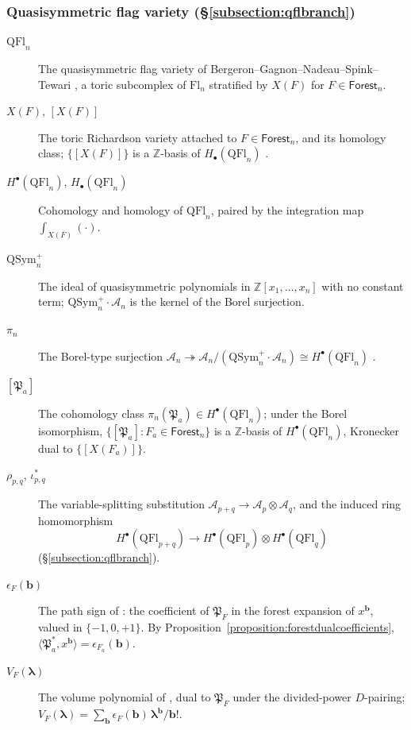 \documentclass{amsart}
\theoremstyle{definition}
\theoremstyle{remark}
\numberwithin{equation}{subsection}
\newcommand{\coma}{\mathcal{A}}
\newcommand{\forest}{\mathfrak{P}}
\begin{document}
\subsubsection*{Quasisymmetric flag variety (\S\ref{subsection:qflbranch})}
\begin{description}
\item[$\mathrm{QFl}_n$] The quasisymmetric flag variety of Bergeron--Gagnon--Nadeau--Spink--Tewari \cite{bergeron2025qsymflag}, a toric subcomplex of $\mathrm{Fl}_n$ stratified by $X(F)$ for $F\in\mathsf{Forest}_n$.
\item[{$X(F)$, $[X(F)]$}] The toric Richardson variety attached to $F\in\mathsf{Forest}_n$, and its homology class; $\{[X(F)]\}$ is a $\mathbb{Z}$-basis of $H_\bullet(\mathrm{QFl}_n)$ \cite[Cor.~11.6]{bergeron2025qsymflag}.
\item[$H^\bullet(\mathrm{QFl}_n)$, $H_\bullet(\mathrm{QFl}_n)$] Cohomology and homology of $\mathrm{QFl}_n$, paired by the integration map $\int_{X(F)}(\cdot)$.
\item[$\mathrm{QSym}_n^+$] The ideal of quasisymmetric polynomials in $\mathbb{Z}[x_1,\ldots,x_n]$ with no constant term; $\mathrm{QSym}_n^+\!\cdot\coma_n$ is the kernel of the Borel surjection.
\item[$\pi_n$] The Borel-type surjection $\coma_n\twoheadrightarrow\coma_n/(\mathrm{QSym}_n^+\!\cdot\coma_n)\cong H^\bullet(\mathrm{QFl}_n)$ \cite[Thm.~A and Cor.~12.5]{bergeron2025qsymflag}.
\item[{$[\forest_a]$}] The cohomology class $\pi_n(\forest_a)\in H^\bullet(\mathrm{QFl}_n)$; under the Borel isomorphism, $\{[\forest_a]:F_a\in\mathsf{Forest}_n\}$ is a $\mathbb{Z}$-basis of $H^\bullet(\mathrm{QFl}_n)$, Kronecker dual to $\{[X(F_a)]\}$.
\item[$\rho_{p,q}$, $\iota_{p,q}^*$] The variable-splitting substitution $\coma_{p+q}\to\coma_p\otimes\coma_q$, and the induced ring homomorphism
$$H^\bullet(\mathrm{QFl}_{p+q})\to H^\bullet(\mathrm{QFl}_p)\otimes H^\bullet(\mathrm{QFl}_q)$$
(\S\ref{subsection:qflbranch}).
\item[$\epsilon_F(\mathbf{b})$] The path sign of \cite[Prop.~10.15]{nadeau2024quasisymmetric}: the coefficient of $\forest_F$ in the forest expansion of $x^{\mathbf{b}}$, valued in $\{-1,0,+1\}$. By Proposition~\ref{proposition:forestdualcoefficients}, $\langle\forest_a^*,x^{\mathbf{b}}\rangle=\epsilon_{F_a}(\mathbf{b})$.
\item[$V_F(\boldsymbol\lambda)$] The volume polynomial of \cite[\S 10.5]{nadeau2024quasisymmetric}, dual to $\forest_F$ under the divided-power $D$-pairing; $V_F(\boldsymbol\lambda)=\sum_{\mathbf{b}}\epsilon_F(\mathbf{b})\,\boldsymbol\lambda^{\mathbf{b}}/\mathbf{b}!$.
\end{description}
\endgroup
\end{document}
